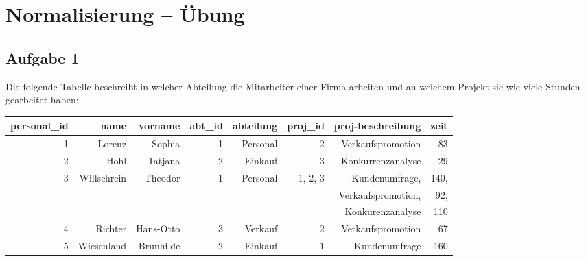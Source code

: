 \clearpage

\rehead[]{\textcolor{lightblue}{AvHG, Inf, My}}
\lohead[]{\textcolor{lightblue}{AvHG, Inf, My}}

\section{Normalisierung -- Übung}

\subsection{Aufgabe 1}

Die folgende Tabelle beschreibt in welcher Abteilung die Mitarbeiter einer Firma
arbeiten und an welchem Projekt sie wie viele Stunden gearbeitet haben:

\begin{tabular}{|r|r|r|r|r|r|r|r|}\hline
\textbf{personal\_id} & \textbf{name} & \textbf{vorname} & \textbf{abt\_id} &
\textbf{abteilung} & \textbf{proj\_id} & \textbf{proj-beschreibung} &
\textbf{zeit}
\\ \hline
1 & Lorenz & Sophia & 1 & Personal & 2 & Verkaufspromotion & 83
\\ \hline 
2 & Hohl & Tatjana & 2 & Einkauf & 3 & Konkurrenzanalyse & 29
\\ \hline
3 & Willschrein & Theodor & 1 & Personal & 1, 2, 3 & Kundenumfrage, & 140,
\\
 & & & & & & Verkaufspromotion, & 92,
\\
 & & & & & & Konkurenzanalyse & 110
\\ \hline
4 & Richter & Hans-Otto & 3 & Verkauf & 2 & Verkaufspromotion & 67
\\ \hline
5 & Wiesenland & Brunhilde & 2 & Einkauf & 1 & Kundenumfrage & 160
\\ \hline
\end{tabular}

